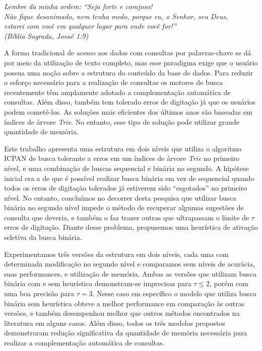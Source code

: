 \documentclass[
	12pt,				%
	openright,			%
	twoside,			%
	a4paper,			%
	english,			%
	spanish,			%
	brazil,				%
	]{abntex2}
\begin{document}

\begin{epigrafe}
    \vspace*{\fill}
	\begin{flushright}
		\textit{
		Lembre da minha ordem: ``Seja forte e corajoso!
		\\ Não fique desanimado, nem tenha medo, porque eu, o Senhor, seu Deus,
		\\ estarei com você em  qualquer lugar para onde você for!''
		\\ (Bíblia Sagrada, Josué 1:9)}
	\end{flushright}
\end{epigrafe}
\newpage
\newpage


\begin{resumo}
A forma tradicional de acesso aos dados com consultas por palavras-chave se dá por meio da utilização de texto completo, mas esse paradigma exige que o usuário possua uma noção sobre a estrutura do conteúdo da base de dados. Para reduzir o esforço necessário para a realização de consultas os motores de busca recentemente têm amplamente adotado a complementação automática de consultas. Além disso, também tem tolerado erros de digitação já que os usuários podem cometê-los. As soluções mais eficientes dos últimos anos são baseadas em índices de árvore \textit{Trie}. No entanto, esse tipo de solução pode utilizar grande quantidade de memória.

Este trabalho apresenta uma estrutura em dois níveis que utiliza o algoritmo ICPAN de busca tolerante a erros em um índices de árvore \textit{Trie} no primeiro nível, e uma combinação de buscas sequencial e binária no segundo. A hipótese inicial era a de que é possível realizar busca binária em vez de sequencial quando todos os erros de digitação tolerados já estiverem sido ``esgotados'' no primeiro nível. No entanto, concluímos no decorrer desta pesquisa que utilizar busca binária no segundo nível impede o método de recuperar algumas sugestões de consulta que deveria, e também o faz trazer outras que ultrapassam o limite de $\tau$ erros de digitação. Diante desse problema, propusemos uma heurística de ativação seletiva da busca binária. 

Experimentamos três versões da estrutura em dois níveis, cada uma com determinada modificação no segundo nível e comparamos seus níveis de acurácia, suas performances, e utilização de memória. Ambas as versões que utilizam busca binária com e sem heurística demonstram-se imprecisas para $\tau \leq 2$, porém com uma boa precisão para $\tau=3$. Nesse caso em específico o modelo que utiliza busca binária sem heurística obteve a melhor performance em comparação às outras versões, e também desempenhou melhor que outros métodos encontrados na literatura em alguns casos. Além disso, todos os três modelos propostos demonstraram redução significativa da quantidade de memória necessária para realizar a complementação automática de consultas.


\end{resumo}
\end{document}
